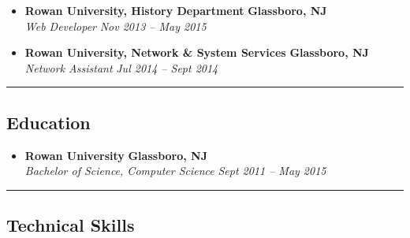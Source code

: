 \begin{itemize}
  \item
  \headerrow
    {\textbf{Rowan University, History Department}}
    {\textbf{Glassboro, NJ}}
  \\
  \headerrow
    {\emph{Web Developer}}
    {\emph{Nov 2013 -- May 2015}}

  \item
  \headerrow
    {\textbf{Rowan University, Network \& System Services}}
    {\textbf{Glassboro, NJ}}
  \\
  \headerrow
    {\emph{Network Assistant}}
    {\emph{Jul 2014 -- Sept 2014}}

\end{itemize}

\hrule
\vspace{-0.4em}
\subsection*{Education}

\begin{itemize}
  \parskip=0.1em

  \item 
  \headerrow
    {\textbf{Rowan University}}
    {\textbf{Glassboro, NJ}}
  \\
  \headerrow
    {\emph{Bachelor of Science, Computer Science}}
    {\emph{Sept 2011 -- May 2015}}

\end{itemize}

\hrule
\vspace{-0.4em}
\subsection*{Technical Skills}

